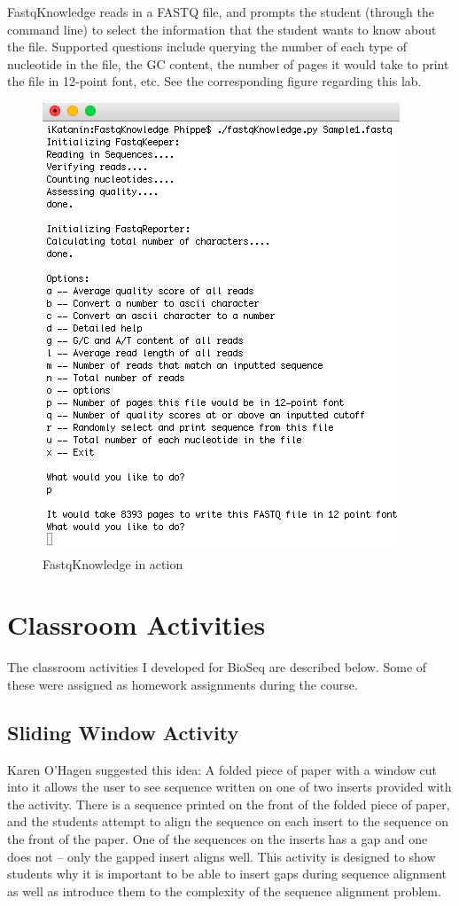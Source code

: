 \documentclass{report}
\begin{document}
FastqKnowledge reads in a FASTQ file, and prompts the student (through the command line) to select the information that the student wants to know about the file. Supported questions include querying the number of each type of nucleotide in the file, the GC content, the number of pages it would take to print the file in 12-point font, etc. See the corresponding figure regarding this lab.

\begin{figure}[h]
\centering
\includegraphics[scale=0.75]{fastqK.png}
\caption{FastqKnowledge in action}
\end{figure}


\section{Classroom Activities}
The classroom activities I developed for BioSeq are described below. Some of these were assigned as homework assignments during the course. 

\subsection{Sliding Window Activity}
Karen O'Hagen suggested this idea: A folded piece of paper with a window cut into it allows the user to see sequence written on one of two inserts provided with the activity. There is a sequence printed on the front of the folded piece of paper, and the students attempt to align the sequence on each insert to the sequence on the front of the paper. One of the sequences on the inserts has a gap and one does not -- only the gapped insert aligns well. This activity is designed to show students why it is important to be able to insert gaps during sequence alignment as well as introduce them to the complexity of the sequence alignment problem.
\end{document}
